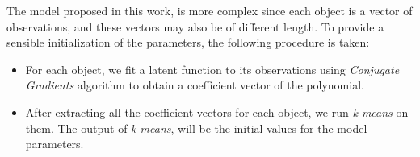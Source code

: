 The model proposed in this work, is more complex since each object is a vector of observations, and these vectors may also be of different length. To provide a sensible initialization of the parameters, the following procedure is taken:
\begin{itemize}
	\item{For each object, we fit a latent function to its observations using \emph{Conjugate Gradients} algorithm to obtain a coefficient vector of the polynomial.}
	\item{After extracting all the coefficient vectors for each object, we run \emph{k-means} on them. The output of \emph{k-means}, will be the initial values for the model parameters.}
\end{itemize}
